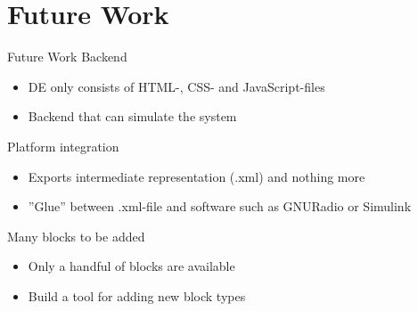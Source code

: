 \documentclass{beamer}
\begin{document}
\section{Future Work}
\begin{frame}{Future Work}
	Backend
	\begin{itemize}
		\item DE only consists of HTML-, CSS- and JavaScript-files
		\item<2-> Backend that can simulate the system
	\end{itemize}
	Platform integration
	\begin{itemize}
		\item Exports intermediate representation (.xml) and nothing more
		\item<3-> ''Glue'' between .xml-file and software such as GNURadio or Simulink
	\end{itemize}
	Many blocks to be added
	\begin{itemize}
		\item Only a handful of blocks are available
		\item<4-> Build a tool for adding new block types
	\end{itemize}
\end{frame}
\end{document}
